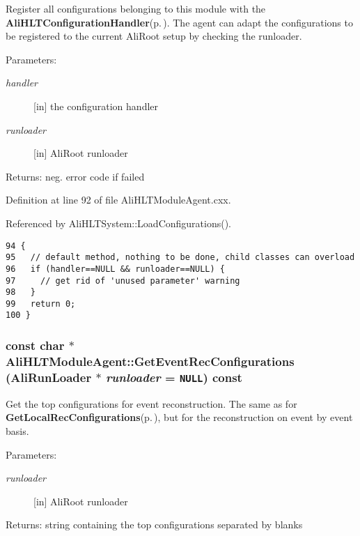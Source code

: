 Register all configurations belonging to this module with the {\bf Ali\-HLTConfiguration\-Handler}{\rm (p.\,\pageref{classAliHLTConfigurationHandler})}. The agent can adapt the configurations to be registered to the current Ali\-Root setup by checking the runloader. \begin{Desc}
\item[Parameters:]
\begin{description}
\item[{\em handler}][in] the configuration handler \item[{\em runloader}][in] Ali\-Root runloader \end{description}
\end{Desc}
\begin{Desc}
\item[Returns:]neg. error code if failed \end{Desc}


Definition at line 92 of file Ali\-HLTModule\-Agent.cxx.

Referenced by Ali\-HLTSystem::Load\-Configurations().

\footnotesize\begin{verbatim}94 {
95   // default method, nothing to be done, child classes can overload
96   if (handler==NULL && runloader==NULL) {
97     // get rid of 'unused parameter' warning
98   }
99   return 0;
100 }
\end{verbatim}\normalsize 


\subsubsection{\setlength{\rightskip}{0pt plus 5cm}const char $\ast$ Ali\-HLTModule\-Agent::Get\-Event\-Rec\-Configurations (Ali\-Run\-Loader $\ast$ {\em runloader} = {\tt NULL}) const\hspace{0.3cm}{\tt  [virtual]}}\label{classAliHLTModuleAgent_a6}


Get the top configurations for event reconstruction. The same as for {\bf Get\-Local\-Rec\-Configurations}{\rm (p.\,\pageref{classAliHLTModuleAgent_a5})}, but for the reconstruction on event by event basis. \begin{Desc}
\item[Parameters:]
\begin{description}
\item[{\em runloader}][in] Ali\-Root runloader \end{description}
\end{Desc}
\begin{Desc}
\item[Returns:]string containing the top configurations separated by blanks \end{Desc}


